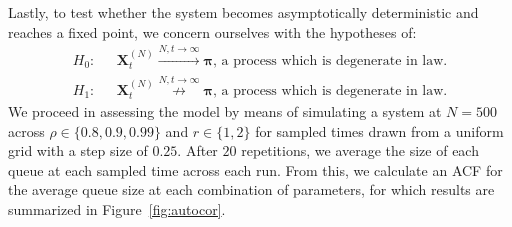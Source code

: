 Lastly, to test whether the system becomes asymptotically deterministic and reaches a fixed point, we concern ourselves with the hypotheses of:
\begin{align*}
    \label{chi 1}
    H_{0} :& \text{ }\mathbf{X}^{(N)}_{t} \overset{N,t \rightarrow \infty}{\rightarrow} \boldsymbol{\pi} \text{, a process which is degenerate in law.}  \\
    H_{1} :& \text{ }\mathbf{X}^{(N)}_{t} \overset{N,t \rightarrow \infty}{\not \rightarrow} \boldsymbol{\pi} \text{, a process which is degenerate in law.}
\end{align*}
We proceed in assessing the model by means of simulating a system at $N=500$ across $\rho \in \{0.8, 0.9 ,0.99\}$ and $r \in \{1,2\}$ for sampled times drawn from a uniform grid with a step size of $0.25$.
After $20$ repetitions, we average the size of each queue at each sampled time across each run.
From this, we calculate an ACF for the average queue size at each combination of parameters, for which results are summarized in Figure~\ref{fig:autocor}.

